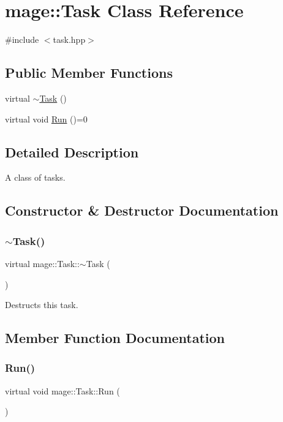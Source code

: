 \hypertarget{classmage_1_1_task}{}\section{mage\+:\+:Task Class Reference}
\label{classmage_1_1_task}


{\ttfamily \#include $<$task.\+hpp$>$}

\subsection*{Public Member Functions}
\begin{DoxyCompactItemize}
\item 
virtual \hyperlink{classmage_1_1_task_a66a892ec09928a904c7c156098a1abbf}{$\sim$\+Task} ()
\item 
virtual void \hyperlink{classmage_1_1_task_af400f88a357ccfa15b860a6b58dc0598}{Run} ()=0
\end{DoxyCompactItemize}


\subsection{Detailed Description}
A class of tasks. 

\subsection{Constructor \& Destructor Documentation}
\hypertarget{classmage_1_1_task_a66a892ec09928a904c7c156098a1abbf}{}\label{classmage_1_1_task_a66a892ec09928a904c7c156098a1abbf} 
\subsubsection{\texorpdfstring{$\sim$\+Task()}{~Task()}}
{\footnotesize\ttfamily virtual mage\+::\+Task\+::$\sim$\+Task (\begin{DoxyParamCaption}{ }\end{DoxyParamCaption})\hspace{0.3cm}{\ttfamily [virtual]}}

Destructs this task. 

\subsection{Member Function Documentation}
\hypertarget{classmage_1_1_task_af400f88a357ccfa15b860a6b58dc0598}{}\label{classmage_1_1_task_af400f88a357ccfa15b860a6b58dc0598} 
\subsubsection{\texorpdfstring{Run()}{Run()}}
{\footnotesize\ttfamily virtual void mage\+::\+Task\+::\+Run (\begin{DoxyParamCaption}{ }\end{DoxyParamCaption})\hspace{0.3cm}{\ttfamily [pure virtual]}}

